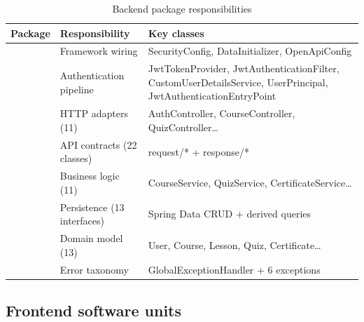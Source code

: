 \begin{table}[H]
\centering
\caption{Backend package responsibilities}
\label{tab:backend-packages}
\begin{tabular}{@{}L{2.9cm}L{6.6cm}L{4.7cm}@{}}
\toprule
\textbf{Package} & \textbf{Responsibility} & \textbf{Key classes} \\
\midrule
{} & Framework wiring & SecurityConfig, DataInitializer, OpenApiConfig \\
 & Authentication pipeline & JwtTokenProvider, JwtAuthenticationFilter, CustomUserDetailsService, UserPrincipal, JwtAuthenticationEntryPoint \\
 & HTTP adapters (11) & AuthController, CourseController, QuizController\dots \\
 & API contracts (22 classes) & request/* + response/* \\
 & Business logic (11) & CourseService, QuizService, CertificateService\dots \\
 & Persistence (13 interfaces) & Spring Data CRUD + derived queries \\
 & Domain model (13) & User, Course, Lesson, Quiz, Certificate\dots \\
 & Error taxonomy & GlobalExceptionHandler + 6 exceptions \\
\bottomrule
\end{tabular}
\end{table}

\subsection{Frontend software units}


